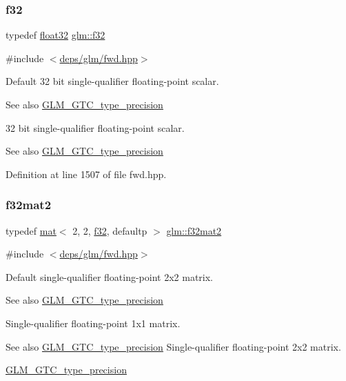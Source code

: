 \subsubsection{\texorpdfstring{f32}{f32}}
{\footnotesize\ttfamily typedef \hyperlink{group__gtc__type__precision_ga814f2f65354b6588b067cc5c67a6b340}{float32} \hyperlink{group__gtc__type__precision_ga0ec999b57f5330d9021256e96038df04}{glm\+::f32}}



{\ttfamily \#include $<$\hyperlink{fwd_8hpp}{deps/glm/fwd.\+hpp}$>$}

Default 32 bit single-\/qualifier floating-\/point scalar. \begin{DoxySeeAlso}{See also}
\hyperlink{group__gtc__type__precision}{G\+L\+M\+\_\+\+G\+T\+C\+\_\+type\+\_\+precision}
\end{DoxySeeAlso}
32 bit single-\/qualifier floating-\/point scalar. \begin{DoxySeeAlso}{See also}
\hyperlink{group__gtc__type__precision}{G\+L\+M\+\_\+\+G\+T\+C\+\_\+type\+\_\+precision} 
\end{DoxySeeAlso}


Definition at line 1507 of file fwd.\+hpp.

\mbox{\label{group__gtc__type__precision_gace6703eef94c05b9985f85759fb113fa}} 
\subsubsection{\texorpdfstring{f32mat2}{f32mat2}}
{\footnotesize\ttfamily typedef \hyperlink{structglm_1_1mat}{mat}$<$ 2, 2, \hyperlink{group__gtc__type__precision_ga0ec999b57f5330d9021256e96038df04}{f32}, defaultp $>$ \hyperlink{group__gtc__type__precision_gace6703eef94c05b9985f85759fb113fa}{glm\+::f32mat2}}



{\ttfamily \#include $<$\hyperlink{fwd_8hpp}{deps/glm/fwd.\+hpp}$>$}

Default single-\/qualifier floating-\/point 2x2 matrix. \begin{DoxySeeAlso}{See also}
\hyperlink{group__gtc__type__precision}{G\+L\+M\+\_\+\+G\+T\+C\+\_\+type\+\_\+precision}
\end{DoxySeeAlso}
Single-\/qualifier floating-\/point 1x1 matrix. \begin{DoxySeeAlso}{See also}
\hyperlink{group__gtc__type__precision}{G\+L\+M\+\_\+\+G\+T\+C\+\_\+type\+\_\+precision} Single-\/qualifier floating-\/point 2x2 matrix. 

\hyperlink{group__gtc__type__precision}{G\+L\+M\+\_\+\+G\+T\+C\+\_\+type\+\_\+precision} 
\end{DoxySeeAlso}


